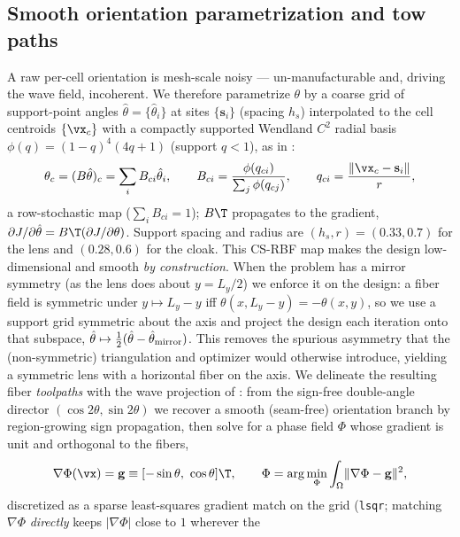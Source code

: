 \subsection{Smooth orientation parametrization and tow paths}
\label{sec:rbf}
A raw per-cell orientation is mesh-scale noisy --- un-manufacturable and, driving
the wave field, incoherent. We therefore parametrize $\theta$ by a coarse grid of
support-point angles $\hat\theta=\{\hat\theta_i\}$ at sites $\{\mathbf s_i\}$
(spacing $h_s$) interpolated to the cell centroids $\{\vx_c\}$ with a compactly
supported Wendland $C^2$ radial basis \cite{wendland1995} $\phi(q)=(1-q)^4(4q+1)$ (support $q<1$), as in \cite{wong2025}:
\begin{equation}
  \theta_c=(B\hat\theta)_c=\sum_i B_{ci}\hat\theta_i,\qquad
  B_{ci}=\frac{\phi(q_{ci})}{\sum_j\phi(q_{cj})},\qquad
  q_{ci}=\frac{\lVert\vx_c-\mathbf s_i\rVert}{r},
  \label{eq:rbf}
\end{equation}
a row-stochastic map ($\sum_i B_{ci}=1$); $B\T$ propagates to the gradient,
$\partial J/\partial\hat\theta=B\T(\partial J/\partial\theta)$. Support spacing and
radius are $(h_s,r)=(0.33,0.7)$ for the lens and $(0.28,0.6)$ for the cloak. This CS-RBF map makes
the design low-dimensional and smooth \emph{by construction}. When the problem has a mirror symmetry (as the
lens does about $y=L_y/2$) we enforce it on the design: a fiber field is
symmetric under $y\!\mapsto\!L_y-y$ iff $\theta(x,L_y-y)=-\theta(x,y)$, so we use
a support grid symmetric about the axis and project the design each iteration
onto that subspace, $\hat\theta\mapsto\tfrac12(\hat\theta-\hat\theta_{\rm mirror})$.
This removes the spurious asymmetry that the (non-symmetric) triangulation and
optimizer would otherwise introduce, yielding a symmetric lens with a horizontal
fiber on the axis. We delineate the resulting fiber \emph{toolpaths} with the
wave projection of \cite{wong2025}: from the sign-free double-angle director
$(\cos2\theta,\sin2\theta)$ we recover a smooth (seam-free) orientation branch by
region-growing sign propagation, then solve for a phase field $\Phi$ whose gradient
is unit and orthogonal to the fibers,
\begin{equation}
  \nabla\Phi(\vx)=\mathbf g\equiv[-\sin\theta,\ \cos\theta]\T,\qquad
  \Phi=\arg\min_{\Phi}\int_\Omega\lVert\nabla\Phi-\mathbf g\rVert^2 ,
  \label{eq:phase}
\end{equation}
discretized as a sparse least-squares gradient match on the grid (\texttt{lsqr};
matching $\nabla\Phi$ \emph{directly} keeps $|\nabla\Phi|$ close to $1$ wherever the
